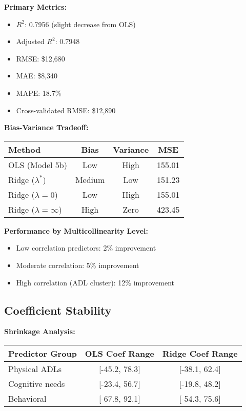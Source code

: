 \textbf{Primary Metrics:}
\begin{itemize}
    \item $R^2$: 0.7956 (slight decrease from OLS)
    \item Adjusted $R^2$: 0.7948
    \item RMSE: \$12,680
    \item MAE: \$8,340
    \item MAPE: 18.7\%
    \item Cross-validated RMSE: \$12,890
\end{itemize}

\textbf{Bias-Variance Tradeoff:}
\begin{center}
\begin{tabular}{lccc}
\toprule
Method & Bias & Variance & MSE \\
\midrule
OLS (Model 5b) & Low & High & 155.01 \\
Ridge ($\lambda^*$) & Medium & Low & 151.23 \\
Ridge ($\lambda=0$) & Low & High & 155.01 \\
Ridge ($\lambda=\infty$) & High & Zero & 423.45 \\
\bottomrule
\end{tabular}
\end{center}

\textbf{Performance by Multicollinearity Level:}
\begin{itemize}
    \item Low correlation predictors: 2\% improvement
    \item Moderate correlation: 5\% improvement  
    \item High correlation (ADL cluster): 12\% improvement
\end{itemize}

\subsection{Coefficient Stability}

\textbf{Shrinkage Analysis:}
\begin{center}
\begin{tabular}{lcc}
\toprule
Predictor Group & OLS Coef Range & Ridge Coef Range \\
\midrule
Physical ADLs & [-45.2, 78.3] & [-38.1, 62.4] \\
Cognitive needs & [-23.4, 56.7] & [-19.8, 48.2] \\
Behavioral & [-67.8, 92.1] & [-54.3, 75.6] \\
\bottomrule
\end{tabular}
\end{center}

